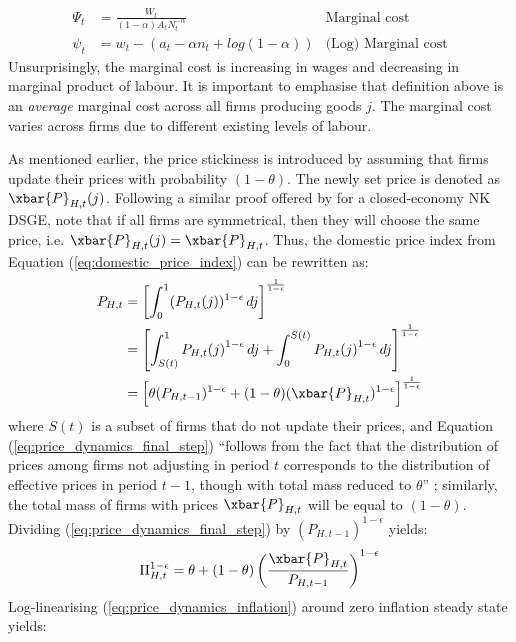 \begin{align}
    \Psi_t &= \frac{W_t}{(1-\alpha)A_t N_t^{-\alpha}} & \text{Marginal cost}\\
    \psi_t &= w_t - (a_t - \alpha n_t + log(1-\alpha)) & \text{(Log) Marginal cost} \label{eq:log_average_marginal_cost}
\end{align}
Unsurprisingly, the marginal cost is increasing in wages and decreasing in marginal product of labour. It is important to emphasise that definition above is an \textit{average} marginal cost across all firms producing goods $j$. The marginal cost varies across firms due to different existing levels of labour. 

As mentioned earlier, the price stickiness is introduced by assuming that firms update their prices with probability $(1-\theta)$. The newly set price is denoted as $\xbar{P}_{H,t}(j)$. Following a similar proof offered by \textcite{jordigal_2015_monetary} for a closed-economy NK DSGE, note that if all firms are symmetrical, then they will choose the same price, i.e. $\xbar{P}_{H,t}(j) = \xbar{P}_{H,t}$. Thus, the domestic price index from Equation (\ref{eq:domestic_price_index}) can be rewritten as:
\begin{align}
    P_{H,t} &= \left[ \int_{0}^{1} (P_{H,t}(j))^{1-\epsilon} \, dj\right]^{\frac{1}{1-\epsilon}} \\
     &= \left[ \int_{S(t)}^{1} {P_{H,t}(j)}^{1-\epsilon} \, dj + \int_{0}^{S(t)}{P_{H,t}(j)}^{1-\epsilon} \, dj\right]^{\frac{1}{1-\epsilon}} \\
     &= \left[ \theta (P_{H,t-1})^{1-\epsilon} + (1-\theta)(\xbar{P}_{H,t})^{1-\epsilon} \right]^{\frac{1}{1-\epsilon}} \label{eq:price_dynamics_final_step}
\end{align}
where $S(t)$ is a subset of firms that do not update their prices, and Equation (\ref{eq:price_dynamics_final_step}) ``follows from the fact that the distribution of prices among firms not adjusting in period $t$ corresponds to the distribution of effective prices in period $t-1$, though with total mass reduced to $\theta$'' \parencite[84]{jordigal_2015_monetary}; similarly, the total mass of firms with prices $\xbar{P}_{H,t}$ will be equal to $(1-\theta)$. Dividing (\ref{eq:price_dynamics_final_step}) by $(P_{H,t-1})^{1-\epsilon}$ yields:
\begin{equation}
    \Pi_{H,t}^{1-\epsilon} = \theta + (1-\theta)\left(\frac{\xbar{P}_{H,t}}{P_{H,t-1}}\right)^{1-\epsilon} \label{eq:price_dynamics_inflation}
\end{equation}
Log-linearising (\ref{eq:price_dynamics_inflation}) around zero inflation steady state yields:
